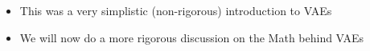 \begin{frame}
\begin{columns}
\begin{overlayarea}{\textwidth}{\textheight}
		\end{overlayarea}
		\begin{overlayarea}{\textwidth}{\textheight}
			\begin{itemize}\justifying
 				\item<1-> This was a very simplistic (non-rigorous) introduction to VAEs
 				\item<2-> We will now do a more rigorous discussion on the Math behind VAEs
			\end{itemize}
		\end{overlayarea}
	\end{columns}
\end{frame}

